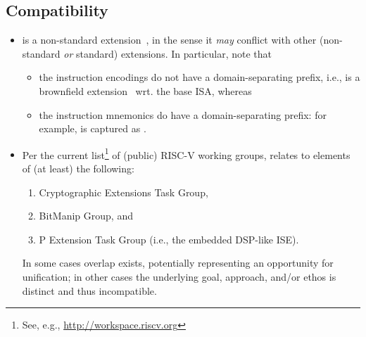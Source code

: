 
\subsection{Compatibility}
\label{sec:bg:compatibility}

\begin{itemize}

\item \XCRYPTO is a 
      non-standard extension~\cite[Section 21.1]{SCARV:RV:ISA:I:17},
      in the sense it {\em may} conflict with other 
      (non-standard {\em or} standard)
      extensions.  In particular, note that

      \begin{itemize}
      \item the 
            instruction encodings
            do not have a domain-separating prefix, i.e., \XCRYPTO is a
            brownfield extension~\cite[Section 21.1]{SCARV:RV:ISA:I:17}
            wrt. the base ISA,
            whereas
      \item the 
            instruction mnemonics 
            do     have a domain-separating prefix:
            for example,  is captured as .
      \end{itemize}

\item Per the current list\footnote{
      See, e.g., \url{http://workspace.riscv.org}
      } of (public) RISC-V working groups, 
      \XCRYPTO relates to elements of (at least) the following:

      \begin{enumerate}
      \item Cryptographic Extensions Task Group,
      \item BitManip                      Group,
            and
      \item P             Extension  Task Group (i.e., the embedded DSP-like ISE).
      \end{enumerate}

      \noindent
      In some cases overlap exists, potentially representing an opportunity
      for unification; in other cases the underlying goal, approach, and/or
      ethos is distinct and thus incompatible.

\end{itemize}

